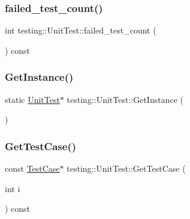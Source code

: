\mbox{\label{classtesting_1_1_unit_test_ace1c860482b4ae5c341df5a9665e5c08}} 
\subsubsection{\texorpdfstring{failed\_test\_count()}{failed\_test\_count()}}
{\footnotesize\ttfamily int testing\+::\+Unit\+Test\+::failed\+\_\+test\+\_\+count (\begin{DoxyParamCaption}{ }\end{DoxyParamCaption}) const}

\mbox{\label{classtesting_1_1_unit_test_af254e2e695471eb9f128bc556bae3668}} 
\subsubsection{\texorpdfstring{GetInstance()}{GetInstance()}}
{\footnotesize\ttfamily static \mbox{\hyperlink{classtesting_1_1_unit_test}{Unit\+Test}}$\ast$ testing\+::\+Unit\+Test\+::\+Get\+Instance (\begin{DoxyParamCaption}{ }\end{DoxyParamCaption})\hspace{0.3cm}{\ttfamily [static]}}

\mbox{\label{classtesting_1_1_unit_test_adf55eb1cc81a43d40ddef75fadded1de}} 
\subsubsection{\texorpdfstring{GetTestCase()}{GetTestCase()}}
{\footnotesize\ttfamily const \mbox{\hyperlink{classtesting_1_1_test_case}{Test\+Case}}$\ast$ testing\+::\+Unit\+Test\+::\+Get\+Test\+Case (\begin{DoxyParamCaption}\item[{int}]{i }\end{DoxyParamCaption}) const}

